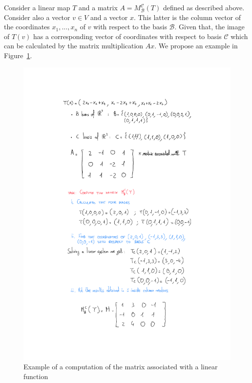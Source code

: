 Consider a linear map $T$ and a matrix $A=M^\mathcal{C}_\mathcal{B}(T)$ defined as described above. Consider also a vector $v \in V$ and a vector $x$. This latter is the column vector of the coordinates $x_1,...,x_n$ of $v$ with respect to the basis $\mathcal{B}$. Given that, the image of $T(v)$ has a corresponding vector of coordinates with respect to basis $\mathcal{C}$ which can be calculated by the matrix multiplication $Ax$. We propose an example in Figure~\ref{fig:linear_function_matrix}.
\begin{figure}
    \centering
    \includegraphics[scale=0.5]{images/Esempio matrice associata a una funzione lineare.pdf}
    \caption{Example of a computation of the matrix associated with a linear function}
    \label{fig:linear_function_matrix}
\end{figure}



